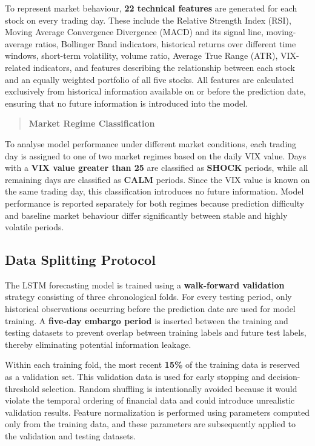To represent market behaviour, \textbf{22 technical features} are
generated for each stock on every trading day. These include the
Relative Strength Index (RSI), Moving Average Convergence Divergence
(MACD) and its signal line, moving-average ratios, Bollinger Band
indicators, historical returns over different time windows, short-term
volatility, volume ratio, Average True Range (ATR), VIX-related
indicators, and features describing the relationship between each stock
and an equally weighted portfolio of all five stocks. All features are
calculated exclusively from historical information available on or
before the prediction date, ensuring that no future information is
introduced into the model.

\begin{quote}
\textbf{Market Regime Classification}
\end{quote}

To analyse model performance under different market conditions, each
trading day is assigned to one of two market regimes based on the daily
VIX value. Days with a \textbf{VIX value greater than 25} are classified
as \textbf{SHOCK} periods, while all remaining days are classified as
\textbf{CALM} periods. Since the VIX value is known on the same trading
day, this classification introduces no future information. Model
performance is reported separately for both regimes because prediction
difficulty and baseline market behaviour differ significantly between
stable and highly volatile periods.

\subsection{Data Splitting Protocol}\label{sec:data-splitting}

The LSTM forecasting model is trained using a \textbf{walk-forward
validation} strategy consisting of three chronological folds. For every
testing period, only historical observations occurring before the
prediction date are used for model training. A \textbf{five-day embargo
period} is inserted between the training and testing datasets to prevent
overlap between training labels and future test labels, thereby
eliminating potential information leakage.

Within each training fold, the most recent \textbf{15\%} of the training
data is reserved as a validation set. This validation data is used for
early stopping and decision-threshold selection. Random shuffling is
intentionally avoided because it would violate the temporal ordering of
financial data and could introduce unrealistic validation results.
Feature normalization is performed using parameters computed only from
the training data, and these parameters are subsequently applied to the
validation and testing datasets.

